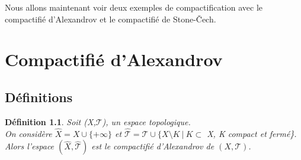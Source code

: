 \documentclass{report}
\newtheorem{definition}{Définition}[section]
\theoremstyle{plain}
\newcommand\T{\mathcal{T}}
\newcommand{\set}[2]{\{#1\:|\:#2\}}
\begin{document}
Nous allons maintenant voir deux exemples de compactification avec le compactifié d'Alexandrov et le compactifié de Stone-\v{C}ech.

\chapter{Compactifié d'Alexandrov}

	\section{Définitions}

		\begin{definition}
			Soit (X,$\T$), un espace topologique.\\On considère $\hat{X} = X\cup \{+\infty\}$ et $\hat{\T} = \T\cup\set{X\setminus K}{K\subset$ X, K compact et fermé}.\\
			Alors l'espace $(\hat{X}, \hat{\T})$ est le compactifié d'Alexandrov de $(X,\T)$.
		\end{definition}
		
\end{document}
